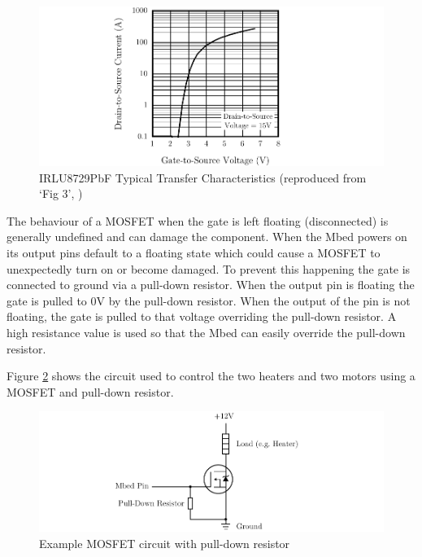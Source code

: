 			\begin{figure}
				\includegraphics[width=1\textwidth]{diagrams/mosfetPerformance.pdf}
				\caption{IRLU8729PbF Typical Transfer Characteristics (reproduced from
				`Fig 3', \cite{MOSFET})}
				\label{fig:mosfetPerformance}
			\end{figure}
			
			The behaviour of a MOSFET when the gate is left floating (disconnected)
			is generally undefined and can damage the component. When the Mbed
			powers on its output pins default to a floating state which could cause
			a MOSFET to unexpectedly turn on or become damaged. To prevent this
			happening the gate is connected to ground via a pull-down resistor. When
			the output pin is floating the gate is pulled to 0V by the pull-down
			resistor. When the output of the pin is not floating, the gate is pulled
			to that voltage overriding the pull-down resistor. A high resistance
			value is used so that the Mbed can easily override the pull-down
			resistor.
			
			Figure \ref{fig:mosfetUsage} shows the circuit used to control the two
			heaters and two motors using a MOSFET and pull-down resistor.
			
			\begin{figure}
				\includegraphics[width=1\textwidth]{diagrams/mosfetUsage.pdf}
				\caption{Example MOSFET circuit with pull-down resistor}
				\label{fig:mosfetUsage}
			\end{figure}
			
